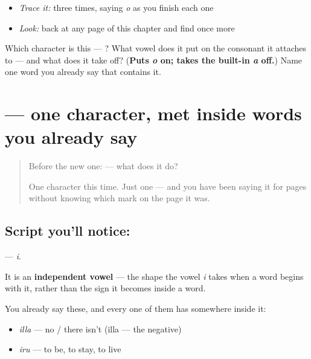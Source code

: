 \begin{quote}
\end{quote}

\begin{itemize}
\raggedright
  \item \emph{Trace it:}  three times, saying \emph{o} as you finish each one
  \item \emph{Look:} back at any page of this chapter and find  once more
\end{itemize}

\begin{tcolorbox}[breakable,colback=teal!4,colframe=teal!35!black,title={Before you move on}]
Which character is this — ? What vowel does it put on the consonant it attaches to — and what does it take off? (\textbf{Puts \emph{o} on; takes the built-in \emph{a} off.}) Name one word you already say that contains it.
\end{tcolorbox}
\section[\texorpdfstring{\kn{ಇ} (i)}{ಇ (i)}]{ — one character, met inside words you already say}

\label{lesson:KA-S115-letter-i}



\begin{quote}
Before the new one:  — what does it do?

One character this time. Just one — and you have been saying it for pages without knowing which mark on the page it was.
\end{quote}

\subsection*{Script you'll notice: }
\textbf{} — \emph{i}.

It is an \textbf{independent vowel} — the shape the vowel \emph{i} takes when a word begins with it, rather than the sign it becomes inside a word.

You already say these, and every one of them has  somewhere inside it:

\begin{itemize}
\raggedright
  \item \textbf{} \emph{illa} — no / there isn't (illa — the negative)
  \item \textbf{} \emph{iru} — to be, to stay, to live
\end{itemize}

